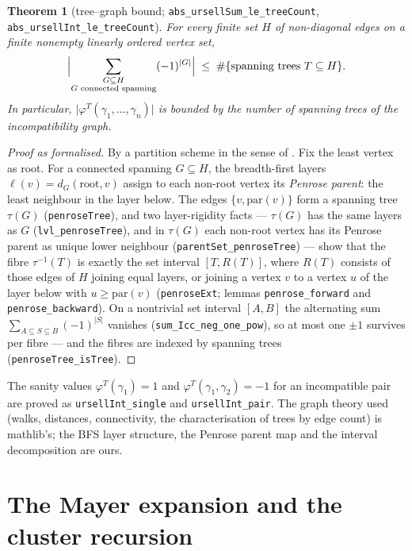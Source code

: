 \documentclass[11pt]{amsart}
\newtheorem{theorem}{Theorem}[section]
\begin{document}
\begin{theorem}[tree--graph bound;
\texttt{abs\_ursellSum\_le\_treeCount},
\texttt{abs\_ursellInt\_le\_treeCount}]\label{thm:penrose}
For every finite set $H$ of non-diagonal edges on a finite nonempty
linearly ordered vertex set,
\[
  \Bigl\lvert \sum_{\substack{G \subseteq H \\ G \text{ connected
  spanning}}} (-1)^{\lvert G \rvert} \Bigr\rvert
  \;\le\; \#\{\text{spanning trees } T \subseteq H\}.
\]
In particular, $\lvert \varphi^{T}(\gamma_1, \dots, \gamma_n) \rvert$ is
bounded by the number of spanning trees of the incompatibility graph.
\end{theorem}

\begin{proof}[Proof as formalised]
By a partition scheme in the sense of \cite[\S2.2]{SS05}. Fix the least
vertex as root. For a connected spanning $G \subseteq H$, the
breadth-first layers $\ell(v) = d_G(\mathrm{root}, v)$ assign to each
non-root vertex its \emph{Penrose parent}: the least neighbour in the
layer below. The edges $\{v, \mathrm{par}(v)\}$ form a spanning tree
$\tau(G)$ (\texttt{penroseTree}), and two layer-rigidity facts —
$\tau(G)$ has the same layers as $G$ (\texttt{lvl\_penroseTree}), and in
$\tau(G)$ each non-root vertex has its Penrose parent as unique lower
neighbour (\texttt{parentSet\_penroseTree}) — show that the fibre
$\tau^{-1}(T)$ is exactly the set interval $[T, R(T)]$, where $R(T)$
consists of those edges of $H$ joining equal layers, or joining a vertex
$v$ to a vertex $u$ of the layer below with $u \ge \mathrm{par}(v)$
(\texttt{penroseExt}; lemmas \texttt{penrose\_forward} and
\texttt{penrose\_backward}). On a nontrivial set interval $[A, B]$ the
alternating sum $\sum_{A \subseteq S \subseteq B} (-1)^{\lvert S \rvert}$
vanishes (\texttt{sum\_Icc\_neg\_one\_pow}), so at most one $\pm 1$
survives per fibre — and the fibres are indexed by spanning trees
(\texttt{penroseTree\_isTree}).
\end{proof}

The sanity values $\varphi^{T}(\gamma_1) = 1$ and
$\varphi^{T}(\gamma_1, \gamma_2) = -1$ for an incompatible pair are
proved as \texttt{ursellInt\_single} and \texttt{ursellInt\_pair}. The
graph theory used (walks, distances, connectivity, the characterisation
of trees by edge count) is \textsf{mathlib}'s; the BFS layer structure,
the Penrose parent map and the interval decomposition are ours.

\section{The Mayer expansion and the cluster recursion}\label{sec:mayer}
\end{document}

